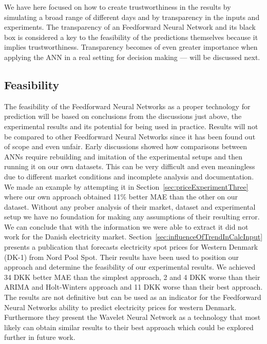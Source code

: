 We have here focused on how to create trustworthiness in the results by simulating a broad range of different days and by transparency in the inputs and experiments. The transparency of an Feedforward Neural Network and its black box is considered a key to the feasibility of the predictions themselves because it implies trustworthiness. Transparency becomes of even greater importance when applying the ANN in a real setting for decision making --- will be discussed next.

\subsection{Feasibility}
The feasibility of the Feedforward Neural Networks as a proper technology for prediction will be based on conclusions from the discussions just above, the experimental results and its potential for being used in practice. Results will not be compared to other Feedforward Neural Networks since it has been found out of scope and even unfair. Early discussions showed how comparisons between ANNs require rebuilding and imitation of the experimental setups and then running it on our own datasets. This can be very difficult and even meaningless due to different market conditions and incomplete analysis and documentation. We made an example by attempting it in Section~\ref{sec:priceExperimentThree} where our own approach obtained 11\% better MAE than the other on our dataset. Without any prober analysis of their market, dataset and experimental setup we have no foundation for making any assumptions of their resulting error. We can conclude that with the information we were able to extract it did not work for the Danish electricity market. Section~\ref{sec:influenceOfTrendInCalcInput} presents a publication that forecasts electricity spot prices for Western Denmark (DK-1) from Nord Pool Spot. Their results have been used to position our approach and determine the feasibility of our experimental results. We achieved 34 DKK better MAE than the simplest approach, 2 and 4 DKK worse than their ARIMA and Holt-Winters approach and 11 DKK worse than their best approach. The results are not definitive but can be used as an indicator for the Feedforward Neural Networks ability to predict electricity prices for western Denmark. Furthermore they present the Wavelet Neural Network as a technology that most likely can obtain similar results to their best approach which could be explored further in future work.

